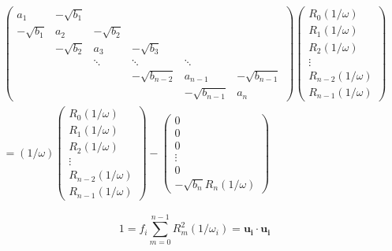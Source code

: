 \begin{equation}
 \begin{split}
 \begin{pmatrix}
a_1        & -\sqrt{b_1}&            &                &             &          \\
-\sqrt{b_1}& a_2        & -\sqrt{b_2}&                &             &          \\
           & -\sqrt{b_2}& a_3        & -\sqrt{b_3}    &             &          \\
           &            & \ddots     & \ddots         & \ddots      &          \\
           &            &            & -\sqrt{b_{n-2}}& a_{n-1}     & -\sqrt{b_{n-1}}\\
           &            &            &                & -\sqrt{b_{n-1}}& a_n   
 \end{pmatrix}
 \begin{pmatrix}
  R_0(1/\omega)\\
  R_1(1/\omega)\\
  R_2(1/\omega)\\
  \vdots\\
  R_{n-2}(1/\omega)\\
  R_{n-1}(1/\omega)
 \end{pmatrix}         \\
 = (1/\omega)
 \begin{pmatrix}
  R_0(1/\omega)\\
  R_1(1/\omega)\\
  R_2(1/\omega)\\
  \vdots\\
  R_{n-2}(1/\omega)\\
  R_{n-1}(1/\omega)
 \end{pmatrix}
 -
 \begin{pmatrix}
  0\\
  0\\
  0\\
  \vdots\\
  0\\
  -\sqrt{b_n} R_{n}(1/\omega)
 \end{pmatrix}
 \end{split}
\end{equation}



\begin{equation}
  1 = f_i \sum\limits_{m=0}^{n-1} R_m^2 (1/\omega_i) = \mathbf{u_i} \cdot \mathbf{u_i}
\end{equation}

